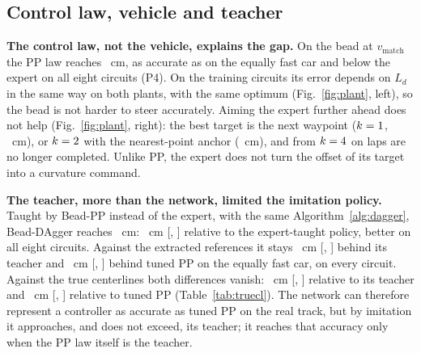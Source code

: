 \documentclass{IJCAS}
\begin{document}
\begin{table}[t]
\caption{RMSE against the extracted references and RMSE, P95 and Geom@0.10 against the true F1TENTH centerlines (eight test circuits).}\label{tab:truecl}
\centering
{}
\end{table}

\subsection{Control law, vehicle and teacher}\label{sec:plant}
\textbf{The control law, not the vehicle, explains the gap.} On the bead at $v_{\mathrm{match}}$ the PP law reaches \VrmseBpp~cm, as accurate as on the equally fast car and below the expert on all eight circuits (P4). On the training circuits its error depends on $L_d$ in the same way on both plants, with the same optimum (Fig.~\ref{fig:plant}, left), so the bead is not harder to steer accurately. Aiming the expert further ahead does not help (Fig.~\ref{fig:plant}, right): the best target is the next waypoint ($k=1$, \VekRmseC~cm), or $k=2$ with the nearest-point anchor (\VekRmseN~cm), and from $k=4$ on laps are no longer completed. Unlike PP, the expert does not turn the offset of its target into a curvature command.

\textbf{The teacher, more than the network, limited the imitation policy.} Taught by Bead-PP instead of the expert, with the same Algorithm~\ref{alg:dagger}, Bead-DAgger reaches \VrmseDaggerBpp~cm: \VcmpBppDagDiff~cm [\VcmpBppDagLo, \VcmpBppDagHi] relative to the expert-taught policy, better on all eight circuits. Against the extracted references it stays \VcmpBppTeachDiff~cm [\VcmpBppTeachLo, \VcmpBppTeachHi] behind its teacher and \VcmpBppFixMDiff~cm [\VcmpBppFixMLo, \VcmpBppFixMHi] behind tuned PP on the equally fast car, on every circuit. Against the true centerlines both differences vanish: \VtrueBppTeachDiff~cm [\VtrueBppTeachLo, \VtrueBppTeachHi] relative to its teacher and \VtrueBppFixMDiff~cm [\VtrueBppFixMLo, \VtrueBppFixMHi] relative to tuned PP (Table~\ref{tab:truecl}). The network can therefore represent a controller as accurate as tuned PP on the real track, but by imitation it approaches, and does not exceed, its teacher; it reaches that accuracy only when the PP law itself is the teacher.
\end{document}
